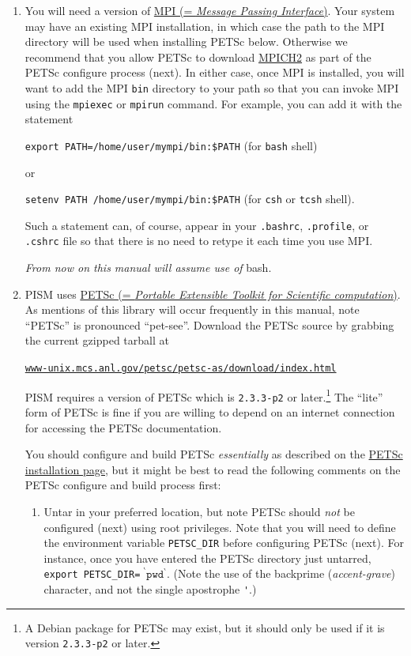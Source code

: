 \documentclass[11pt,final]{amsart}
\newcommand{\PETSCREV}{2.3.3-p2}
\renewcommand{\t}[1]{\texttt{#1}}
\begin{document}
\begin{enumerate}
\item You will need a version of \href{http://www-unix.mcs.anl.gov/mpi/}{MPI (= \emph{Message Passing Interface})}.  Your system may have an existing MPI installation, in which case the path to the MPI directory will be used when installing PETSc below.  Otherwise we recommend that you allow PETSc to download \href{http://www-unix.mcs.anl.gov/mpi/mpich2/}{MPICH2} as part of the PETSc configure process (next).  In either case, once MPI is installed, you will want to add the MPI \verb|bin| directory to your path so that you can invoke MPI using the \verb|mpiexec| or \verb|mpirun| command.  For example, you can add it with the statement

\verb|export PATH=/home/user/mympi/bin:$PATH|  \qquad (for \verb|bash| shell)

\noindent or

\verb|setenv PATH /home/user/mympi/bin:$PATH|  \qquad (for \verb|csh| or \verb|tcsh| shell).

\noindent Such a statement can, of course, appear in your \verb|.bashrc|, \verb|.profile|, or \verb|.cshrc| file so that there is no need to retype it each time you use MPI.

\medskip
\centerline{\emph{From now on this manual will assume use of} bash.}
\medskip

\item PISM uses   \href{http://www-unix.mcs.anl.gov/petsc/petsc-2/index.html}{PETSc (= \emph{Portable Extensible Toolkit for Scientific computation})}.  As mentions of this library will occur frequently in this manual, note ``PETSc'' is pronounced ``pet-see''.  Download the PETSc source by grabbing the current gzipped tarball at  
   \centerline{\href{http://www-unix.mcs.anl.gov/petsc/petsc-as/download/index.html}{\t{www-unix.mcs.anl.gov/petsc/petsc-as/download/index.html}}}
PISM requires a version of PETSc which is \texttt{\PETSCREV} or later.\footnote{A Debian package for PETSc may exist, but it should only be used if it is version \texttt{\PETSCREV} or later.}   The ``lite'' form of PETSc is fine if you are willing to depend on an internet connection for accessing the PETSc documentation. 

You should configure and build PETSc \emph{essentially} as described on the  \href{http://www-unix.mcs.anl.gov/petsc/petsc-2/documentation/installation.html}{PETSc installation page}, but it might be best to read the following comments on the PETSc configure and build process first:

\renewcommand{\labelenumii}{(\roman{enumii})}\begin{enumerate}
\item Untar in your preferred location, but note PETSc should \emph{not} be configured (next) using root privileges.  Note that you will need to define the environment variable \verb|PETSC_DIR| before configuring PETSc (next).  For instance, once you have entered the PETSc directory just untarred, \verb|export PETSC_DIR=|$\phantom{!}^\backprime \mathtt{pwd}^\backprime$.  (Note the use of the backprime (\emph{accent-grave}) character, and not the single apostrophe \verb|'|.)


\end{enumerate}
\end{enumerate}
\end{document}
